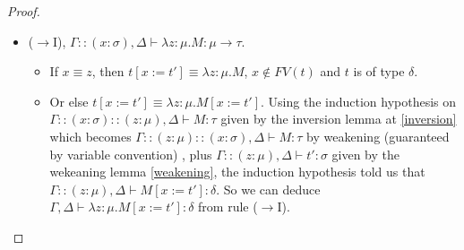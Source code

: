 \documentclass{article}
\newtheorem*{remark}{Remark}
\begin{document}
\begin{proof}
\begin{itemize}
\begin{itemize}
                \item Or else $x\not\equiv z$ then $z[x:=t']\equiv z$ and $\Gamma::(x:\sigma),\Delta\vdash z : \delta$.We can deduce $\Gamma,\Delta\vdash z : \delta$ because since $z : \delta\not\in (x : \sigma)$ we must have $z :\delta \in \Gamma$.
            \end{itemize} 
            \begin{remark}\end{remark}
        While Coq is a constructive system that rejects the excluded middle tierce as we have discussed at \ref{constructive logic}, there are still some situations implying similar assertions. It is the case of the \texttt{eqb} boolean equality on naturals (the datatype of our type variables) and strings (the datatype of our term variables). Such boolean operation denoted \texttt{x=?y} used with the equality proposition \texttt{x=y} builds a particular datatype beside the following \texttt{eqb\_spec} lemma from the Coq standard library \cite{coq-stdlib} :\\
        \verb|Lemma eqb_spec s1 s2 : Bool.reflect (s1 = s2) (s1 =? s2).|\\
        and here is the inductive definition of \texttt{reflect} : \begin{verbatim}Inductive reflect (P : Prop) : bool -> Set :=
  | ReflectT : P -> reflect P true
  | ReflectF : ~ P -> reflect P false.\end{verbatim}The use of this lemma is to help us build proofs of the form either $x\equiv z$ or $x\not\equiv z$ as in the previous point without breaking that constructive property of Coq.\par
  The tactic \texttt{destruct (eqb\_spec x z).} will generate two subgoals with respective hypotheses \texttt{x=z} and \texttt{x<>z} that can be combined with \texttt{eqb\_eq} and \texttt{eqb\_neq} respectively:\begin{verbatim}Lemma eqb_eq x y : (x =? y) = true <-> x = y.
Lemma eqb_neq x y : (x =? y) = false <-> x <> y
  \end{verbatim}

            \item ($\rightarrow$I), $\Gamma::(x:\sigma),\Delta\vdash\lambda z:\mu.M : \mu\rightarrow\tau$.
            \begin{itemize}
                \item If $x\equiv z$, then $t[x:=t']\equiv\lambda z:\mu.M$, $x\not\in FV(t)$ and $t$ is of type $\delta$.
                \item Or else $t[x:=t']\equiv\lambda z:\mu.M[x:=t']$. Using the induction hypothesis on $\Gamma::(x:\sigma)::(z : \mu),\Delta\vdash M :\tau$ given by the inversion lemma at \ref{inversion} which becomes $\Gamma::(z : \mu)::(x:\sigma),\Delta\vdash M :\tau$ by weakening (guaranteed by variable convention) , plus $\Gamma::(z : \mu),\Delta\vdash t':\sigma$ given by the wekeaning lemma \ref{weakening}, the induction hypothesis told us that $\Gamma::(z:\mu),\Delta\vdash M[x:=t'] : \delta$. So we can deduce $\Gamma,\Delta\vdash\lambda z : \mu.M[x:=t'] : \delta$ from rule ($\rightarrow$I).
            \end{itemize} 


\end{itemize}
\end{proof}
\end{document}
